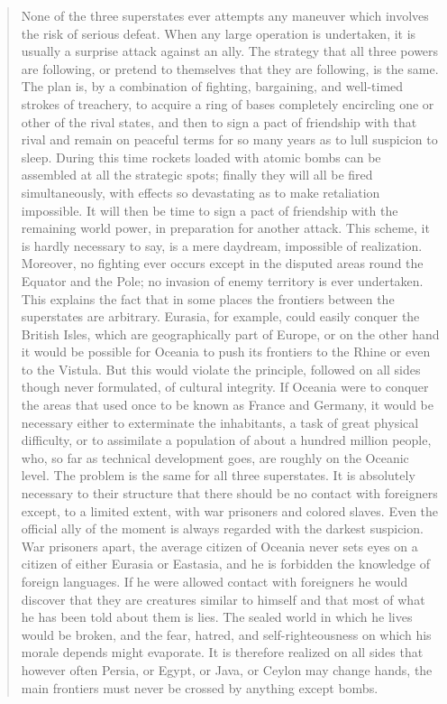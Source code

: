 \begin{quotation}
None of the three superstates ever attempts any maneuver which involves
the risk of serious defeat. When any large operation is undertaken, it
is usually a surprise attack against an ally. The strategy that all
three powers are following, or pretend to themselves that they are
following, is the same. The plan is, by a combination of fighting,
bargaining, and well-timed strokes of treachery, to acquire a ring of
bases completely encircling one or other of the rival states, and then
to sign a pact of friendship with that rival and remain on peaceful
terms for so many years as to lull suspicion to sleep. During this time
rockets loaded with atomic bombs can be assembled at all the strategic
spots; finally they will all be fired simultaneously, with effects so
devastating as to make retaliation impossible. It will then be time to
sign a pact of friendship with the remaining world power, in preparation
for another attack. This scheme, it is hardly necessary to say, is a
mere daydream, impossible of realization. Moreover, no fighting ever
occurs except in the disputed areas round the Equator and the Pole; no
invasion of enemy territory is ever undertaken. This explains the fact
that in some places the frontiers between the superstates are arbitrary.
Eurasia, for example, could easily conquer the British Isles, which are
geographically part of Europe, or on the other hand it would be possible
for Oceania to push its frontiers to the Rhine or even to the Vistula.
But this would violate the principle, followed on all sides though never
formulated, of cultural integrity. If Oceania were to conquer the areas
that used once to be known as France and Germany, it would be necessary
either to exterminate the inhabitants, a task of great physical
difficulty, or to assimilate a population of about a hundred million
people, who, so far as technical development goes, are roughly on the
Oceanic level. The problem is the same for all three superstates. It is
absolutely necessary to their structure that there should be no contact
with foreigners except, to a limited extent, with war prisoners and
colored slaves. Even the official ally of the moment is always regarded
with the darkest suspicion. War prisoners apart, the average citizen of
Oceania never sets eyes on a citizen of either Eurasia or Eastasia, and
he is forbidden the knowledge of foreign languages. If he were allowed
contact with foreigners he would discover that they are creatures
similar to himself and that most of what he has been told about them is
lies. The sealed world in which he lives would be broken, and the fear,
hatred, and self-righteousness on which his morale depends might
evaporate. It is therefore realized on all sides that however often
Persia, or Egypt, or Java, or Ceylon may change hands, the main
frontiers must never be crossed by anything except bombs.


\end{quotation}
